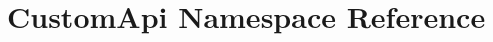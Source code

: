 \hypertarget{namespace_custom_api}{}\section{Custom\+Api Namespace Reference}
\label{namespace_custom_api}
